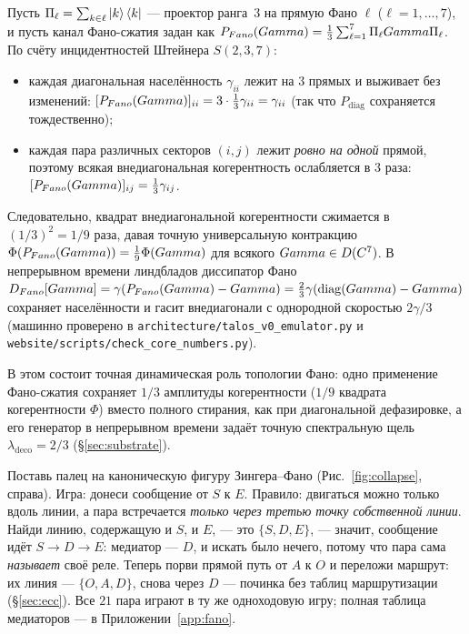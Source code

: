 \begin{claimbox}
Пусть $\Pi_\ell = \sum_{k\in\ell}\ket{k}\bra{k}$ --- проектор ранга~$3$ на
прямую Фано $\ell$ ($\ell=1,\dots,7$), и пусть канал Фано-сжатия задан как
$P_{Fano}(Gamma) = \tfrac{1}{3}\sum_{\ell=1}^{7}\Pi_\ell Gamma\Pi_\ell$.
По счёту инцидентностей Штейнера $S(2,3,7)$:
\begin{itemize}[leftmargin=1.4em,itemsep=1pt]
  \item каждая диагональная населённость $\gamma_{ii}$ лежит на $3$ прямых и
        выживает без изменений: $[P_{Fano}(Gamma)]_{ii} =
        3\cdot\tfrac13\gamma_{ii} = \gamma_{ii}$ (так что $P_{\mathrm{diag}}$
        сохраняется тождественно);
  \item каждая пара различных секторов $(i,j)$ лежит \emph{ровно на одной}
        прямой, поэтому всякая внедиагональная когерентность ослабляется в $3$
        раза: $[P_{Fano}(Gamma)]_{ij} = \tfrac13\gamma_{ij}$.
\end{itemize}
Следовательно, квадрат внедиагональной когерентности сжимается в $(1/3)^2 = 1/9$
раза, давая точную универсальную контракцию
$\Phi(P_{Fano}(Gamma)) = \tfrac{1}{9}\Phi(Gamma)$ для всякого
$Gamma\in D(C^7)$. В непрерывном времени линдбладов диссипатор Фано
$D_{Fano}[Gamma]=\gamma(P_{Fano}(Gamma)-Gamma)
=\tfrac{2}{3}\gamma(\operatorname{diag}(Gamma)-Gamma)$ сохраняет населённости и
гасит внедиагонали с однородной скоростью $2\gamma/3$ (машинно проверено в
\texttt{architecture/talos\_v0\_emulator.py} и
\texttt{website/scripts/check\_core\_numbers.py}).
\end{claimbox}

В этом состоит точная динамическая роль топологии Фано: одно применение
Фано-сжатия сохраняет $1/3$ амплитуды когерентности ($1/9$ квадрата
когерентности $\Phi$) вместо полного стирания, как при диагональной дефазировке,
а его генератор в непрерывном времени задаёт точную спектральную щель
$\lambda_{\mathrm{deco}}=2/3$ (\S\ref{sec:substrate}).

\begin{trybox}
Поставь палец на каноническую фигуру Зингера--Фано (Рис.~\ref{fig:collapse},
справа). Игра: донеси сообщение от $S$ к $E$. Правило: двигаться можно только
вдоль линии, а пара встречается \emph{только через третью точку собственной
линии}. Найди линию, содержащую и $S$, и $E$, --- это $\{S,D,E\}$, --- значит,
сообщение идёт $S\to D\to E$: медиатор --- $D$, и искать было нечего, потому что
пара сама \emph{называет} своё реле. Теперь порви прямой путь от $A$ к $O$ и
переложи маршрут: их линия --- $\{O,A,D\}$, снова через $D$ --- починка без
таблиц маршрутизации (\S\ref{sec:ecc}). Все $21$ пара играют в ту же одноходовую
игру; полная таблица медиаторов --- в Приложении~\ref{app:fano}.
\end{trybox}

